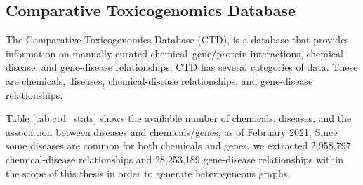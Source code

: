 \subsection{Comparative Toxicogenomics Database}
The Comparative Toxicogenomics Database \cite{davis2021comparative} (CTD), is a database that provides information on manually curated chemical–gene$/$protein interactions, chemical-disease, and gene-disease relationships. CTD has several categories of data. These are chemicals, diseases, chemical-disease relationships, and gene-disease relationships. 



Table \ref{tab:ctd_stats} shows the available number of chemicals, diseases, and the association between diseases and chemicals$/$genes, as of February 2021. Since some diseases are common for both chemicals and genes, we extracted 2,958,797 chemical-disease relationships and 28,253,189 gene-disease relationships within the scope of this thesis in order to generate heterogeneous graphs.

